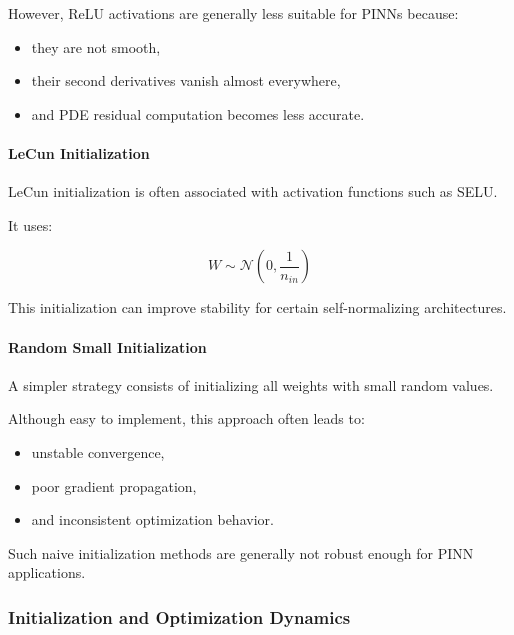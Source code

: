However, ReLU activations are generally less suitable for PINNs because:
\begin{itemize}
    \item they are not smooth,
    \item their second derivatives vanish almost everywhere,
    \item and PDE residual computation becomes less accurate.
\end{itemize}

\paragraph{LeCun Initialization}

LeCun initialization is often associated with activation functions such as SELU.

It uses:

\begin{equation}
W
\sim
\mathcal{N}
\left(
0,
\frac{1}{n_{in}}
\right)
\end{equation}

This initialization can improve stability for certain self-normalizing architectures.

\paragraph{Random Small Initialization}

A simpler strategy consists of initializing all weights with small random values.

Although easy to implement, this approach often leads to:
\begin{itemize}
    \item unstable convergence,
    \item poor gradient propagation,
    \item and inconsistent optimization behavior.
\end{itemize}

Such naive initialization methods are generally not robust enough for PINN applications.

\subsubsection{Initialization and Optimization Dynamics}

